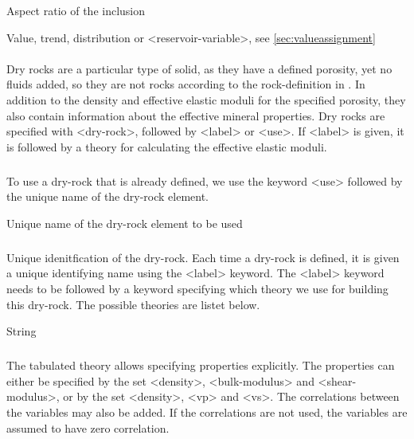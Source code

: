 {
 \slist
   \item \Description Aspect ratio of the inclusion
   \item \Argument Value, trend, distribution or <reservoir-variable>, see \autoref{sec:valueassignment}
   \item \Default
 \elist

\paragraph{}
 \slist
   \item \Description Dry rocks are a particular type of solid, as they have a defined porosity, yet no fluids added, so they are not rocks according to the rock-definition in . In addition to the density and effective elastic moduli for the specified porosity, they also contain information about the effective mineral properties. 
Dry rocks are specified with <dry-rock>, followed by <label> or <use>. If <label> is given, it is followed by a theory for calculating the effective elastic moduli.
   \item \Argument 
   \item \Default 
 \elist

\subparagraph{}
 \slist
   \item \Description  To use a dry-rock that is already defined, we use the keyword <use> followed by the unique name of the dry-rock element.
   \item \Argument Unique name of the dry-rock element to be used
   \item \Default 
 \elist

\subparagraph{}
 \slist
   \item \Description Unique idenitfication of the dry-rock. Each time a dry-rock is defined, it is given a unique identifying name using
the <label> keyword. The <label> keyword needs to be followed by a keyword specifying which theory we use for building this dry-rock. The possible theories are listet below. 
   \item \Argument String
   \item \Default 
 \elist

\subparagraph{}
 \slist
   \item \Description The tabulated theory allows specifying properties explicitly. The properties can either be specified by the set <density>, <bulk-modulus> and <shear-modulus>, or by the set <density>, <vp> and <vs>. The correlations between the variables may also be added. If the correlations are not used, the variables are assumed to have zero correlation. 
   \item \Argument
   \item \Default 
 \elist

}
